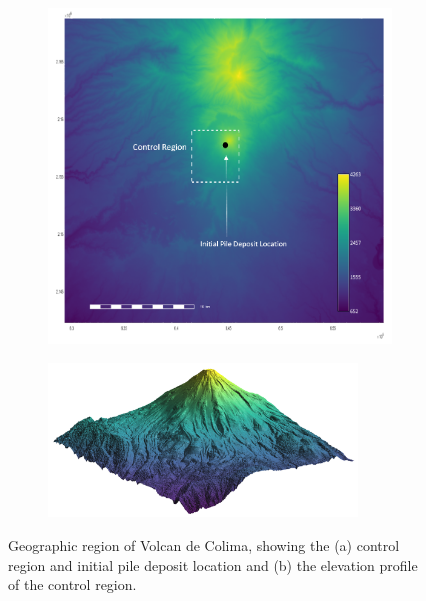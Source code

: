 \begin{figure}[H]
\begin{subfigure}{0.4\textwidth}
\centering
\includegraphics[width=\textwidth]{dem_figs/colima_4}
\caption{}
\label{colima_1}
\end{subfigure}
\centering
\begin{subfigure}{0.55\textwidth}
\includegraphics[width=0.9\textwidth]{dem_figs/colima_el}
\caption{}
\label{colima_2}
\end{subfigure}
\caption{Geographic region of Volcan de Colima, showing the (a) control region and initial pile deposit location and (b) the elevation profile of the control region.}
\label{fig:colima}
\end{figure}

